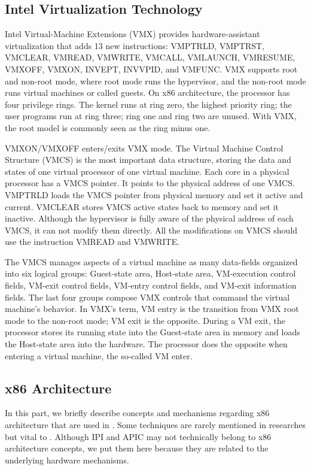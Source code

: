 \subsection{Intel Virtualization Technology}

Intel Virtual-Machine Extensions (VMX) provides hardware-assistant virtualization that adds 13 new instructions: VMPTRLD, VMPTRST, VMCLEAR, VMREAD, VMWRITE, VMCALL, VMLAUNCH, VMRESUME, VMXOFF, VMXON, INVEPT, INVVPID, and VMFUNC. VMX supports root and non-root mode, where root mode runs the hypervisor, and the non-root mode runs virtual machines or called guests. On x86 architecture, the processor has four privilege rings. The kernel runs at ring zero, the highest priority ring; the user programs run at ring three; ring one and ring two are unused. With VMX, the root model is commonly seen as the ring minus one.

VMXON/VMXOFF enters/exits VMX mode. The Virtual Machine Control Structure (VMCS) is the most important data structure, storing the data and states of one virtual processor of one virtual machine. Each core in a physical processor has a VMCS pointer. It points to the physical address of one VMCS. VMPTRLD loads the VMCS pointer from physical memory and set it active and current. VMCLEAR stores VMCS active states back to memory and set it inactive. Although the hypervisor is fully aware of the physical address of each VMCS, it can not modify them directly. All the modifications on VMCS should use the instruction VMREAD and VMWRITE. 

The VMCS manages aspects of a virtual machine as many data-fields organized into six logical groups: Guest-state area, Host-state area, VM-execution control fields, VM-exit control fields, VM-entry control fields, and VM-exit information fields. The last four groups compose VMX controls that command the virtual machine's behavior. In VMX's term, VM entry is the transition from VMX root mode to the non-root mode; VM exit is the opposite. During a VM exit, the processor stores its running state into the Guest-state area in memory and loads the Host-state area into the hardware. The processor does the opposite when entering a virtual machine, the so-called VM enter.


\subsection{x86 Architecture}

In this part, we briefly describe concepts and mechanisms regarding x86 architecture that are used in \name. Some techniques are rarely mentioned in researches but vital to \name. Although IPI and APIC may not technically belong to x86 architecture concepts, we put them here because they are related to the underlying hardware mechanisms.


